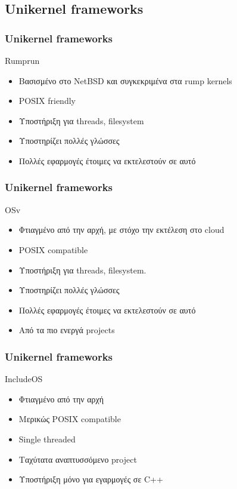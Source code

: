 \documentclass[red,slidestop,notes,compress,mathserif]{beamer}
\begin{document}
\subsection{Unikernel frameworks}

\begin{frame}
\frametitle{Unikernel frameworks}
	\begin{block}{Rumprun}
		\begin{itemize}
			\item Βασισμένο στο NetBSD και συγκεκριμένα στα rump kernels 
			\item POSIX friendly
			\item Υποστήριξη για threads, filesystem
			\item Υποστηρίζει πολλές γλώσσες
			\item Πολλές εφαρμογές έτοιμες να εκτελεστούν σε αυτό
		\end{itemize}
	\end{block}
\end{frame}
\begin{frame}
\frametitle{Unikernel frameworks}
	\begin{block}{OSv}
		\begin{itemize}
			\item Φτιαγμένο από την αρχή, με στόχο την εκτέλεση στο cloud
			\item POSIX compatible
			\item Υποστήριξη για threads, filesystem.
			\item Υποστηρίζει πολλές γλώσσες
			\item Πολλές εφαρμογές έτοιμες να εκτελεστούν σε αυτό
			\item Από τα πιο ενεργά projects
		\end{itemize}
	\end{block}
\end{frame}
\begin{frame}
\frametitle{Unikernel frameworks}
	\begin{block}{IncludeOS}
		\begin{itemize}
			\item Φτιαγμένο από την αρχή
			\item Μερικώς POSIX compatible
			\item Single threaded
			\item Ταχύτατα αναπτυσσόμενο project
			\item Υποστήριξη μόνο για εγαρμογές σε C++
		\end{itemize}
	\end{block}
\end{frame}
\end{document}
